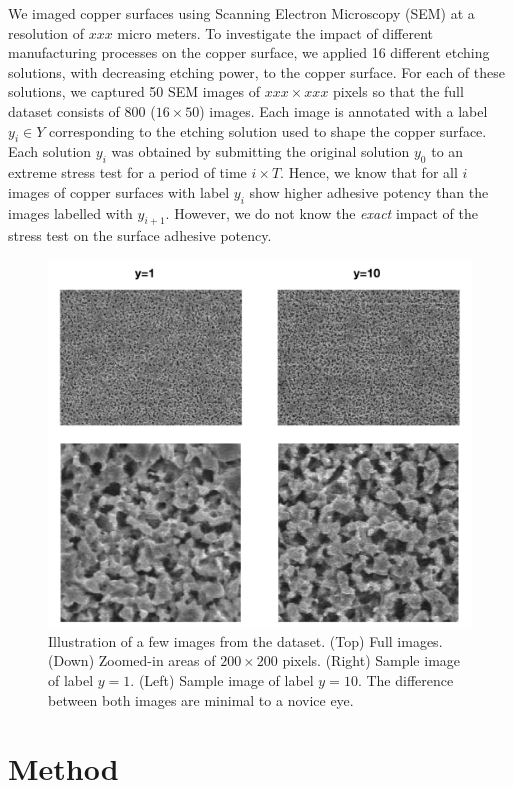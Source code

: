 \documentclass[10pt,twocolumn,letterpaper]{article}
\begin{document}
We imaged copper surfaces using Scanning Electron Microscopy (SEM) at a resolution of $xxx$ micro meters.
To investigate the impact of different manufacturing processes on the copper surface, 
we applied 16 different etching solutions, with decreasing etching power, to the copper surface.
For each of these solutions, we captured 50 SEM images of $xxx \times xxx$ pixels so that the full dataset
consists of $800$ ($16 \times 50$) images.
Each image is annotated with a label $y_i \in Y$ corresponding to the etching solution used to shape the copper surface.
Each solution $y_i$ was obtained by submitting the original solution $y_0$ to an extreme stress test for a period of time $i \times T$.
Hence, we know that for all $i$ images of copper surfaces with label $y_i$ show higher adhesive potency than the images labelled with $y_{i+1}$.
However, we do not know the \textit{exact} impact of the stress test on the surface adhesive potency.

\begin{figure}[h]
	\centering
	\includegraphics[width=0.9\linewidth]{"./figures/Figure3"}
	\caption{
		Illustration of a few images from the dataset. (Top) Full images. (Down) Zoomed-in areas of $200 \times 200$ pixels. (Right) Sample image of label $y=1$. (Left) Sample image of label $y=10$. The difference between both images are minimal to a novice eye.
	}
\end{figure}

\section{Method}
\end{document}
